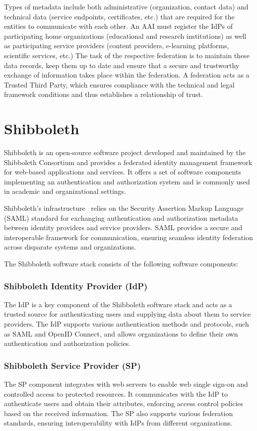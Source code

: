 Types of metadata include both administrative (organization, contact data) and
technical data (service endpoints, certificates, etc.) that are required for the
entities to communicate with each other. An AAI must register the IdPs of
participating home organizations (educational and research institutions) as well
as participating service providers (content providers, e-learning platforms,
scientific services, etc.) The task of the respective federation is to maintain
these data records, keep them up to date and ensure that a secure and
trustworthy exchange of information takes place within the federation. A
federation acts as a Trusted Third Party, which ensures compliance with the
technical and legal framework conditions and thus establishes a relationship of
trust. 

\section{Shibboleth}
Shibboleth is an open-source software project developed and maintained by the
Shibboleth Consortium and provides a federated identity management framework
for web-based applications and services. It offers a set of software components
implementing an authentication and authorization system and is commonly used in
academic and organizational settings.

Shibboleth's infrastructure~\cite{cantor2005shibboleth} relies on the Security
Assertion Markup Language (SAML) standard for exchanging authentication and
authorization metadata between identity providers and service providers. SAML
provides a secure and interoperable framework for communication, ensuring
seamless identity federation across disparate systems and organizations. 

The Shibboleth software stack consists of the following software components:

\subsubsection*{Shibboleth Identity Provider (IdP)}
The IdP is a key component of the Shibboleth software stack and acts as a
trusted source for authenticating users and supplying data about them to service
providers. The IdP supports various authentication methods and protocols, such
as SAML and OpenID Connect, and allows organizations to define their own
authentication and authorization policies.

\subsubsection*{Shibboleth Service Provider (SP)}
The SP component integrates with web servers to enable web single sign-on and
controlled access to protected resources. It communicates with the IdP to
authenticate users and obtain their attributes, enforcing access control
policies based on the received information. The SP also supports various
federation standards, ensuring interoperability with IdPs from different
organizations.

